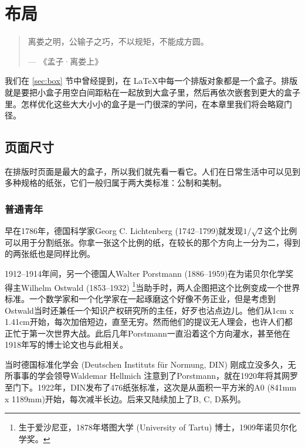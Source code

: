 \chapter{布局}

\begin{quotation}
离娄之明，公输子之巧，不以规矩，不能成方圆。
\begin{flushright}
--- 《孟子·离娄上》
\end{flushright}
\end{quotation}

我们在 \ref{sec:box} 节中曾经提到，在 \LaTeX 中每一个排版对象都是一个盒子。排版就是要把小盒子用空白间距粘在一起放到大盒子里，然后再依次嵌套到更大的盒子里。怎样优化这些大大小小的盒子是一门很深的学问，在本章里我们将会略窥门径。

\section{页面尺寸}

在排版时页面是最大的盒子，所以我们就先看一看它。人们在日常生活中可以见到多种规格的纸张，它们一般归属于两大类标准：公制和美制。

\subsection{普通青年}

早在1786年，德国科学家Georg C. Lichtenberg (1742--1799)就发现$1/\sqrt{2}$这个比例可以用于分割纸张。你拿一张这个比例的纸，在较长的那个方向上一分为二，得到的两张纸也是同样比例。

1912--1914年间，另一个德国人Walter Porstmann (1886--1959)在为诺贝尔化学奖得主Wilhelm Ostwald (1853--1932) \footnote{生于爱沙尼亚，1878年塔图大学 (University of Tartu) 博士，1909年诺贝尔化学奖。}当助手时，两人企图把这个比例变成一个世界标准。一个数学家和一个化学家在一起琢磨这个好像不务正业，但是考虑到Ostwald当时还兼任一个知识产权研究所的主任，好歹也沾点边儿。他们从1cm x 1.41cm开始，每次加倍短边，直至无穷。然而他们的提议无人理会，也许人们都正忙于第一次世界大战。此后几年Porstmann一直沿着这个方向灌水，甚至他在1918年写的博士论文也与此相关。

当时德国标准化学会 (Deutschen Instituts für Normung, DIN) 刚成立没多久，无所事事的学会领导Waldemar Hellmich 注意到了Porstmann，就在1920年将其网罗至门下。1922年，DIN发布了476纸张标准，这次是从面积一平方米的A0 (841mm x 1189mm)开始，每次减半长边。后来又陆续加上了B, C, D系列。


